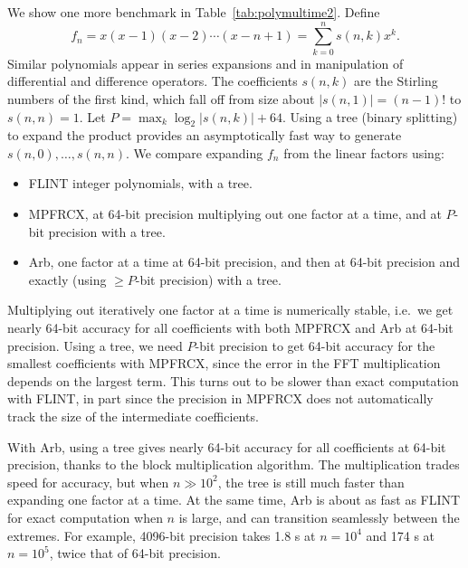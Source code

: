 \documentclass[10pt,journal,compsoc,cspaper]{IEEEtran}
\begin{document}
We show one more benchmark in Table~\ref{tab:polymultime2}.
Define
$$f_n = x(x-1)(x-2)\cdots(x-n+1) = \sum_{k=0}^n s(n,k) x^k.$$
Similar polynomials appear in series expansions
and in manipulation of differential and difference operators.
The coefficients $s(n,k)$ are the Stirling numbers of the first kind,
which fall off from size about $|s(n,1)| = (n-1)!$ to $s(n,n) = 1$.
Let $P = \max_k \log_2 |s(n,k)| + 64$.
Using a tree (binary splitting) to expand the product
provides an asymptotically fast way to generate $s(n,0), \ldots, s(n,n)$.
We compare expanding $f_n$ from the linear factors using:
\begin{itemize}
\item FLINT integer polynomials, with a tree.
\item MPFRCX, at 64-bit precision multiplying out one factor at a time,
and at $P$-bit precision with a tree.
\item Arb, one factor at a time at 64-bit precision, and then
at 64-bit precision and exactly (using $\ge P$-bit precision) with a tree.
\end{itemize}
Multiplying out iteratively one factor at a time is numerically stable, i.e.\
we get nearly 64-bit accuracy for all coefficients with both
MPFRCX and Arb at 64-bit precision.
Using a tree, we need $P$-bit precision
to get 64-bit accuracy for the smallest coefficients with MPFRCX, since
the error in the FFT multiplication depends on the largest term.
This turns out to be slower than exact computation with FLINT,
in part since the precision in MPFRCX does not automatically
track the size of the intermediate coefficients.

With Arb, using a tree gives nearly 64-bit accuracy for all coefficients
at 64-bit precision, thanks to the block multiplication algorithm.
The multiplication trades speed for accuracy, but when $n \gg 10^2$, the tree is still
much faster than expanding one factor at a time.
At the same time, Arb is about as fast as FLINT for exact computation
when $n$ is large, and can transition seamlessly between the
extremes.
For example, 4096-bit precision takes 1.8 s at $n = 10^4$ and 174 s at $n = 10^5$,
twice that of 64-bit precision.
\end{document}
